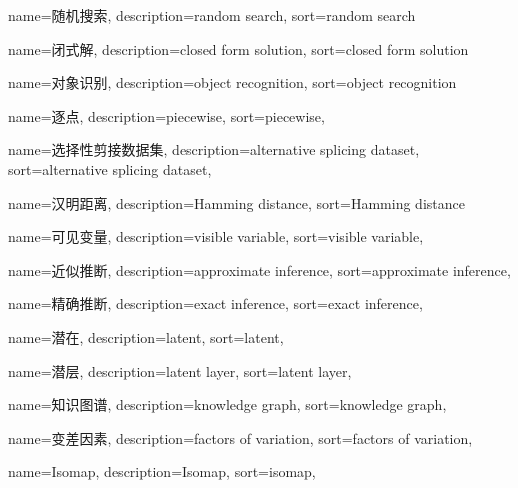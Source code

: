 {
  name=随机搜索,
  description={random search},
  sort={random search}
}

{
  name=闭式解,
  description={closed form solution},
  sort={closed form solution}
}

{
  name=对象识别,
  description={object recognition},
  sort={object recognition}
}

{
  name=逐点,
  description={piecewise},
  sort={piecewise},
}

{
  name=选择性剪接数据集,
  description={alternative splicing dataset},
  sort={alternative splicing dataset},
}

{
  name=汉明距离,
  description={Hamming distance},
  sort={Hamming distance}
}

{
  name=可见变量,
  description={visible variable},
  sort={visible variable},
}

{
  name=近似推断,
  description={approximate inference},
  sort={approximate inference},
}

{
  name=精确推断,
  description={exact inference},
  sort={exact inference},
}

{
  name=潜在,
  description={latent},
  sort={latent},
}

{
  name=潜层,
  description={latent layer},
  sort={latent layer},
}

{
  name=知识图谱,
  description={knowledge graph},
  sort={knowledge graph},
}

{
  name=变差因素,
  description={factors of variation},
  sort={factors of variation},
}

{
  name=Isomap,
  description={Isomap},
  sort={isomap},
}
